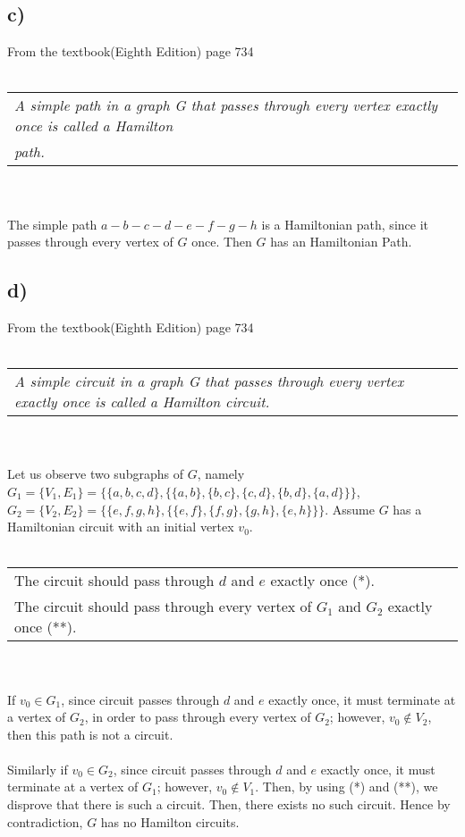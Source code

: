 \documentclass[11pt]{article}
\begin{document}
\subsection*{c)}
From the textbook(Eighth Edition) page 734
\\ \\
\begin{tabular}{l}
    \textit{A simple path in a graph G that passes through every vertex exactly once is called a Hamilton}\\
    \textit{path.} 
\end{tabular}
\\ \\
The simple path $a-b-c-d-e-f-g-h$ is a Hamiltonian path, since it passes through every vertex of $G$ once.
Then $G$ has an Hamiltonian Path.
\subsection*{d)}
From the textbook(Eighth Edition) page 734
\\ \\
\begin{tabular}{l}
    \textit{A simple circuit in a graph G that passes through every vertex exactly once is called a Hamilton circuit.}  
\end{tabular}
\\ \\
Let us observe two subgraphs of $G$, namely $G_1=\{V_1,E_1\}=\{\{a,b,c,d\},\{\{a,b\},\{b,c\},\{c,d\},\{b,d\},\{a,d\}\}\}$, 
$G_2=\{V_2,E_2\}=\{\{e,f,g,h\},\{\{e,f\},\{f,g\},\{g,h\},\{e,h\}\}\}$. Assume $G$ has a 
Hamiltonian circuit with an initial vertex $v_0$. 
\\ \\
\begin{tabular}{l}
    The circuit should pass through $d$ and $e$ exactly once (*).\\
    The circuit should pass through every vertex of $G_1$ and $G_2$ exactly once (**).
\end{tabular}
\\ \\
If $v_0 \in G_1$, since circuit passes through $d$ and $e$ exactly once, it must terminate at a vertex of $G_2$, in order
to pass through every vertex of $G_2$; however, $v_0 \notin V_2$, then this path is not a circuit. 
\\ \\
Similarly if $v_0 \in G_2$, since circuit passes through $d$ and $e$ exactly once, it must terminate at a 
vertex of $G_1$; however, $v_0 \notin V_1$. Then, by using (*) and (**), we disprove
that there is such a circuit. Then, there exists no such circuit. 
Hence by contradiction, $G$ has no Hamilton circuits.
\end{document}
